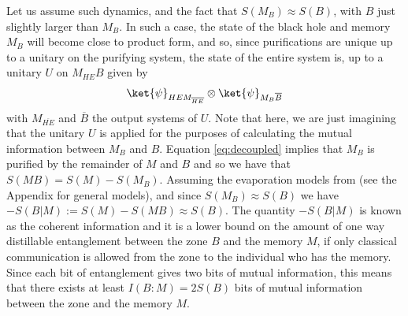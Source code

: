 \documentclass[12pt,a4paper]{article}
\begin{document}
Let us assume such dynamics, and the fact that $S(M_B)\approx S(B)$, with $B$ just slightly larger than $M_B$. In such a case,
the state of the black hole and memory $M_B$ will become close to product form\cite{FQSW,HaydenPreskill,dupuis2010one}, and so, since purifications are unique up to a unitary on the purifying system, the state of the entire system is, up to a unitary $U$ on $M_{HE}B$ given by
\begin{align}
\ket{\psi}_{HEM_{\overline{HE}}}\otimes\ket{\psi}_{M_B\overline{B}}
\label{eq:decoupled}
\end{align}
with $M_{\overline{HE}}$ and $\overline{B}$ the output systems of $U$. Note that here, we are just imagining that the unitary $U$ is applied for the purposes of calculating the mutual information between $M_B$ and $B$. Equation \eqref{eq:decoupled} implies that $M_B$ is purified by the remainder of $M$ and $B$ and so we have
 that $S(MB)=S(M)-S(M_B)$. 
Assuming the evaporation models from \cite{bhlock,HaydenPreskill,sekino2008fast} (see the Appendix for general models), and since $S(M_B)\approx S(B)$ we have
$-S(B|M):=S(M)-S(MB)\approx S(B)$.
The quantity $-S(B|M)$ is known as the coherent information\cite{schumacher1996quantum} and it is a lower bound on the amount of one way distillable entanglement between the zone $B$ and the memory $M$, if only classical communication is allowed from the zone to the individual who has the memory\cite{devetak2005distillation}. Since each bit of entanglement gives two bits of mutual information, this means that there exists at least $I(B:M)=2S(B)$ bits of mutual information between the zone and the memory $M$. 
\end{document}
